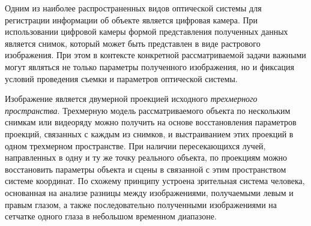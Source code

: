 \begin{SCn}
\end{SCn}

Одним из наиболее распространенных видов оптической системы для регистрации информации об объекте является цифровая камера. При использовании цифровой камеры формой представления полученных данных является снимок, который может быть представлен в виде растрового изображения. При этом в контексте конкретной рассматриваемой задачи важными могут являться не только параметры полученного изображения, но и фиксация условий проведения съемки и параметров оптической системы.  

Изображение является двумерной проекцией исходного \textit{трехмерного пространства}. Трехмерную модель рассматриваемого объекта по нескольким снимкам или видеоряду можно получить на основе восстановления параметров проекций, связанных с каждым из снимков, и выстраиванием этих проекций в одном трехмерном пространстве. При наличии пересекающихся лучей, направленных в одну и ту же точку реального объекта, по проекциям можно восстановить параметры объекта и сцены в связанной с этим пространством системе координат. По схожему принципу устроена зрительная система человека, основанная на анализе разницы между изображениями, получаемыми левым и правым глазом, а также последовательно полученными изображениями на сетчатке одного глаза в небольшом временном диапазоне.

\begin{SCn}
\end{SCn}

\begin{SCn}
\end{SCn}

\begin{SCn}
\end{SCn}

